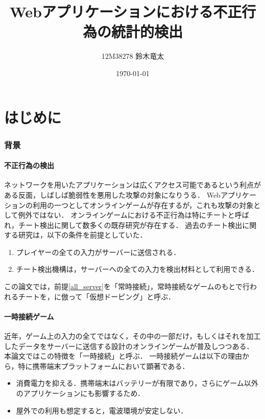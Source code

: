 \documentclass[a4paper,11pt]{jsarticle}
\title{Webアプリケーションにおける不正行為の統計的検出}
\author{12M38278 鈴木竜太}
\date{\today}
\begin{document}

\tableofcontents

\newpage

\part{はじめに}
\section{背景}
\subsection{不正行為の検出}
ネットワークを用いたアプリケーションは広くアクセス可能であるという利点がある反面，しばしば脆弱性を悪用した攻撃の対象になりうる．
Webアプリケーションの利用の一つとしてオンラインゲームが存在するが，これも攻撃の対象として例外ではない．
オンラインゲームにおける不正行為は特にチートと呼ばれ，チート検出に関して数多くの既存研究が存在する．
過去のチート検出に関する研究は，以下の条件を前提としていた．

\begin{enumerate}
\item
\label{all_server}プレイヤーの全ての入力がサーバーに送信される．
\item
チート検出機構は，サーバーへの全ての入力を検出材料として利用できる．
\end{enumerate}

この論文では，前提\ref{all_server}を「常時接続」，常時接続なゲームのもとで行われるチートを，\cite{gamefps}に倣って「仮想ドーピング」と呼ぶ．

\subsection{一時接続ゲーム}
近年，ゲーム上の入力の全てではなく，その中の一部だけ，もしくはそれを加工したデータをサーバーに送信する設計のオンラインゲームが普及しつつある．
本論文ではこの特徴を「一時接続」と呼ぶ．
一時接続ゲームは以下の理由から，特に携帯端末プラットフォームにおいて顕著である．

\begin{itemize}
\item
消費電力を抑える．携帯端末はバッテリーが有限であり，さらにゲーム以外のアプリケーションにも影響するため．
\item
屋外での利用も想定すると，電波環境が安定しない．
\end{itemize}
\end{document}
